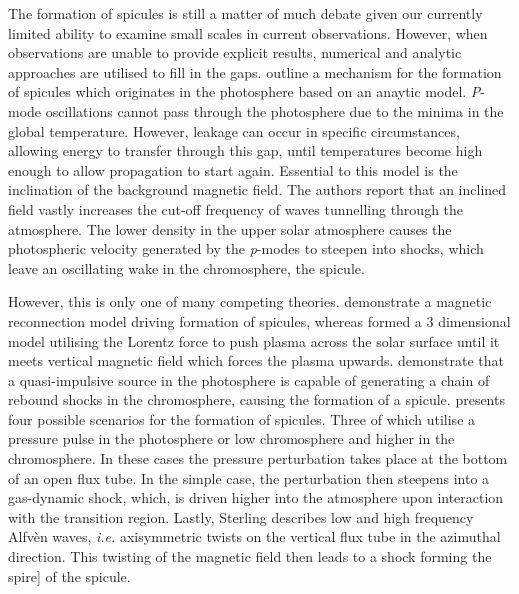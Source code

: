 The formation of spicules is still a matter of much debate given our currently limited ability to examine small scales in current observations. 
However, when observations are unable to provide explicit results, numerical and analytic approaches are utilised to fill in the gaps.
\cite{DePointeu2004} outline a mechanism for the formation of spicules which originates in the photosphere based on an anaytic model.
\emph{P}-mode oscillations cannot pass through the photosphere due to the minima in the global temperature.
However, leakage can occur in specific circumstances, allowing energy to transfer through this gap, until temperatures become high enough to allow propagation to start again.
Essential to this model is the inclination of the background magnetic field.
The authors report that an inclined field vastly increases the cut-off frequency of waves tunnelling through the atmosphere. 
The lower density in the upper solar atmosphere causes the photospheric velocity generated by the \emph{p}-modes to steepen into shocks, which leave an oscillating wake in the chromosphere, the spicule.

However, this is only one of many competing theories.
\cite{Takeuchi2001} demonstrate a magnetic reconnection model driving formation of spicules, whereas \cite{Martinez2011} formed a $3$ dimensional model utilising the Lorentz force to push plasma across the solar surface until it meets vertical magnetic field which forces the plasma upwards.
\cite{Hollweg1982} demonstrate that a quasi-impulsive source in the photosphere is capable of generating a chain of rebound shocks in the chromosphere, causing the formation of a spicule.
\cite{(Sterling2000)} presents four possible scenarios for the formation of spicules.
Three of which utilise a pressure pulse in the photosphere or low chromosphere and higher in the chromosphere. 
In these cases the pressure perturbation takes place at the bottom of an open flux tube.
In the simple case, the perturbation then steepens into a gas-dynamic shock, which, is driven higher into the atmosphere upon interaction with the transition region.
Lastly, Sterling describes low and high frequency Alfv{\`e}n waves, \emph{i.e.} axisymmetric twists on the vertical flux tube in the azimuthal direction.
This twisting of the magnetic field then leads to a shock forming the spire] of the spicule.

